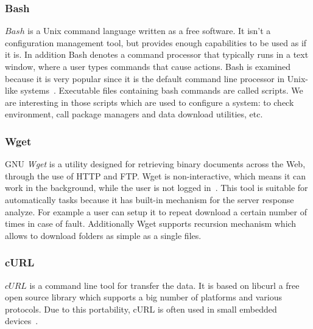 \subsubsection*{Bash} \label{lang:bash}
$Bash$ is a Unix command language written as a free software.
It isn't a configuration management tool, but provides enough capabilities to be used as if it is.
In addition Bash denotes a command processor that typically runs in a text window, where a user types commands that cause actions.
Bash is examined because it is very popular since it is the default command line processor in Unix-like systems~\cite*{bashdef}.
Executable files containing bash commands are called scripts.
We are interesting in those scripts which are used to configure a system: to check environment, call package managers and data download utilities, etc.

\subsubsection*{Wget}
GNU \emph{Wget} is a utility designed for retrieving binary documents across the Web, through the use of HTTP and FTP.
Wget is non-interactive, which means it can work in the background, while the user is not logged in~\cite{wget_desc}.
This tool is suitable for automatically  tasks because it has built-in mechanism for the server response analyze.
For example a user can setup it to repeat download a certain number of times in case of fault.
Additionally Wget supports recursion mechanism which allows to download folders as simple as a single files.
\subsubsection*{cURL}
$cURL$ is a command line tool for transfer the data.
 It is based on libcurl a free open source library which supports a big number of platforms and various protocols.
Due to this portability, cURL is often used in small embedded devices~\cite{curl}.
